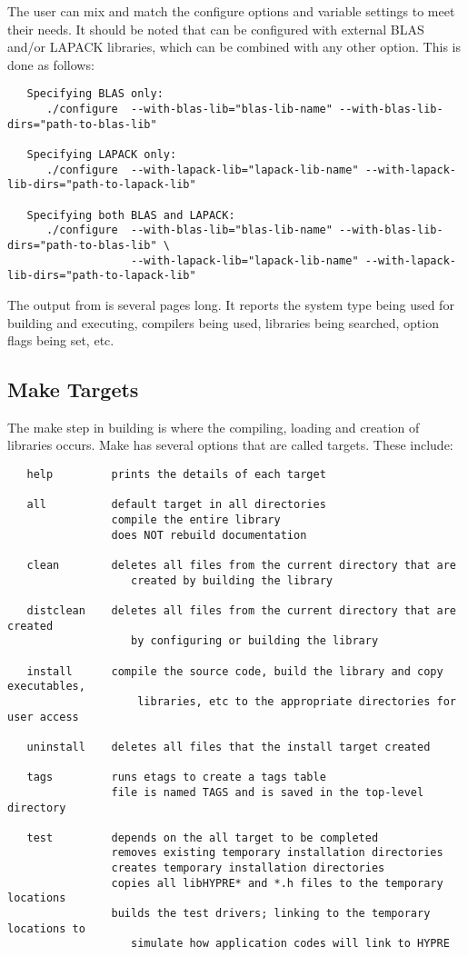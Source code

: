 The user can mix and match the configure options and variable settings to meet their 
needs.  It should be noted that \hypre{} can be configured with external BLAS and/or
LAPACK libraries, which can be combined with any other option.  This is done as follows:

\begin{verbatim}
   Specifying BLAS only:
      ./configure  --with-blas-lib="blas-lib-name" --with-blas-lib-dirs="path-to-blas-lib"

   Specifying LAPACK only:
      ./configure  --with-lapack-lib="lapack-lib-name" --with-lapack-lib-dirs="path-to-lapack-lib"

   Specifying both BLAS and LAPACK:
      ./configure  --with-blas-lib="blas-lib-name" --with-blas-lib-dirs="path-to-blas-lib" \
                   --with-lapack-lib="lapack-lib-name" --with-lapack-lib-dirs="path-to-lapack-lib"
\end{verbatim}

The output from  is several pages long.  It reports the system type 
being used for building and executing, compilers being used, libraries being searched,
option flags being set, etc.  


\subsection{Make Targets}

The make step in building \hypre{} is where the compiling, loading and creation 
of libraries occurs.  Make has several options that are called targets.  These include:
\begin{verbatim}
   help         prints the details of each target

   all          default target in all directories
                compile the entire library
                does NOT rebuild documentation

   clean        deletes all files from the current directory that are 
                   created by building the library

   distclean    deletes all files from the current directory that are created
                   by configuring or building the library

   install      compile the source code, build the library and copy executables,
                    libraries, etc to the appropriate directories for user access

   uninstall    deletes all files that the install target created

   tags         runs etags to create a tags table
                file is named TAGS and is saved in the top-level directory

   test         depends on the all target to be completed
                removes existing temporary installation directories
                creates temporary installation directories
                copies all libHYPRE* and *.h files to the temporary locations
                builds the test drivers; linking to the temporary locations to
                   simulate how application codes will link to HYPRE
\end{verbatim}


